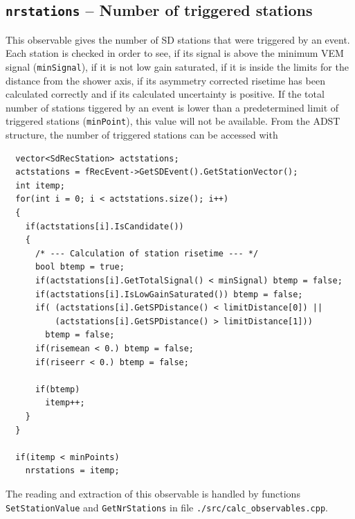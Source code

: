 \documentclass[12pt,a4paper]{report}
\begin{document}
\subsection{\texttt{nrstations} -- Number of triggered stations}
This observable gives the number of SD stations that were triggered by an event. Each station is checked in order to see, if its signal is above the minimum VEM signal (\texttt{minSignal}), if it is not low gain saturated, if it is inside the limits for the distance from the shower axis, if its asymmetry corrected risetime has been calculated correctly and if its calculated uncertainty is positive. If the total number of stations tiggered by an event is lower than a predetermined limit of triggered stations (\texttt{minPoint}), this value will not be available. From the ADST structure, the number of triggered stations can be accessed with
\begin{verbatim}
  vector<SdRecStation> actstations;
  actstations = fRecEvent->GetSDEvent().GetStationVector();
  int itemp;
  for(int i = 0; i < actstations.size(); i++)
  {
    if(actstations[i].IsCandidate())
    {
      /* --- Calculation of station risetime --- */
      bool btemp = true;
      if(actstations[i].GetTotalSignal() < minSignal) btemp = false;
      if(actstations[i].IsLowGainSaturated()) btemp = false;
      if( (actstations[i].GetSPDistance() < limitDistance[0]) || 
          (actstations[i].GetSPDistance() > limitDistance[1]))
        btemp = false;
      if(risemean < 0.) btemp = false;
      if(riseerr < 0.) btemp = false;

      if(btemp)
        itemp++;
    }
  }

  if(itemp < minPoints)
    nrstations = itemp;
\end{verbatim}
The reading and extraction of this observable is handled by functions \texttt{SetStationValue} and \texttt{GetNrStations} in file \texttt{./src/calc\_observables.cpp}.
\end{document}
